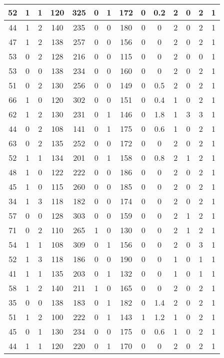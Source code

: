 \documentclass{article}
\begin{document}
\begin{longtable}{|c|c|c|c|c|c|c|c|c|c|c|c|c|c|}
\hline
52 & 1 & 1 & 120 & 325 & 0 & 1 & 172 & 0 & 0.2 & 2 & 0 & 2 & 1\\
\hline
44 & 1 & 2 & 140 & 235 & 0 & 0 & 180 & 0 & 0 & 2 & 0 & 2 & 1\\
\hline
47 & 1 & 2 & 138 & 257 & 0 & 0 & 156 & 0 & 0 & 2 & 0 & 2 & 1\\
\hline
53 & 0 & 2 & 128 & 216 & 0 & 0 & 115 & 0 & 0 & 2 & 0 & 0 & 1\\
\hline
53 & 0 & 0 & 138 & 234 & 0 & 0 & 160 & 0 & 0 & 2 & 0 & 2 & 1\\
\hline
51 & 0 & 2 & 130 & 256 & 0 & 0 & 149 & 0 & 0.5 & 2 & 0 & 2 & 1\\
\hline
66 & 1 & 0 & 120 & 302 & 0 & 0 & 151 & 0 & 0.4 & 1 & 0 & 2 & 1\\
\hline
62 & 1 & 2 & 130 & 231 & 0 & 1 & 146 & 0 & 1.8 & 1 & 3 & 3 & 1\\
\hline
44 & 0 & 2 & 108 & 141 & 0 & 1 & 175 & 0 & 0.6 & 1 & 0 & 2 & 1\\
\hline
63 & 0 & 2 & 135 & 252 & 0 & 0 & 172 & 0 & 0 & 2 & 0 & 2 & 1\\
\hline
52 & 1 & 1 & 134 & 201 & 0 & 1 & 158 & 0 & 0.8 & 2 & 1 & 2 & 1\\
\hline
48 & 1 & 0 & 122 & 222 & 0 & 0 & 186 & 0 & 0 & 2 & 0 & 2 & 1\\
\hline
45 & 1 & 0 & 115 & 260 & 0 & 0 & 185 & 0 & 0 & 2 & 0 & 2 & 1\\
\hline
34 & 1 & 3 & 118 & 182 & 0 & 0 & 174 & 0 & 0 & 2 & 0 & 2 & 1\\
\hline
57 & 0 & 0 & 128 & 303 & 0 & 0 & 159 & 0 & 0 & 2 & 1 & 2 & 1\\
\hline
71 & 0 & 2 & 110 & 265 & 1 & 0 & 130 & 0 & 0 & 2 & 1 & 2 & 1\\
\hline
54 & 1 & 1 & 108 & 309 & 0 & 1 & 156 & 0 & 0 & 2 & 0 & 3 & 1\\
\hline
52 & 1 & 3 & 118 & 186 & 0 & 0 & 190 & 0 & 0 & 1 & 0 & 1 & 1\\
\hline
41 & 1 & 1 & 135 & 203 & 0 & 1 & 132 & 0 & 0 & 1 & 0 & 1 & 1\\
\hline
58 & 1 & 2 & 140 & 211 & 1 & 0 & 165 & 0 & 0 & 2 & 0 & 2 & 1\\
\hline
35 & 0 & 0 & 138 & 183 & 0 & 1 & 182 & 0 & 1.4 & 2 & 0 & 2 & 1\\
\hline
51 & 1 & 2 & 100 & 222 & 0 & 1 & 143 & 1 & 1.2 & 1 & 0 & 2 & 1\\
\hline
45 & 0 & 1 & 130 & 234 & 0 & 0 & 175 & 0 & 0.6 & 1 & 0 & 2 & 1\\
\hline
44 & 1 & 1 & 120 & 220 & 0 & 1 & 170 & 0 & 0 & 2 & 0 & 2 & 1\\

\end{longtable}
\end{document}
